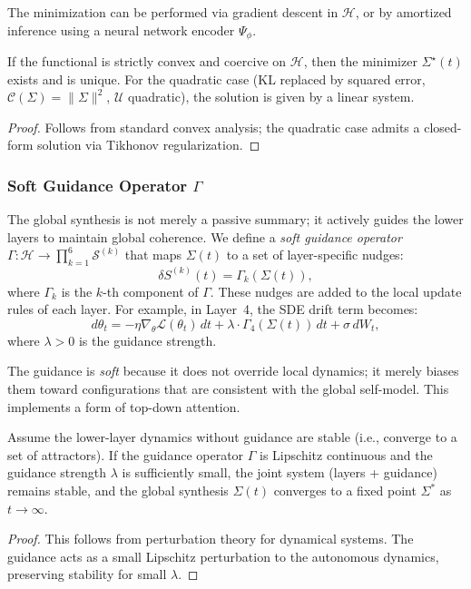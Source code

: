 The minimization can be performed via gradient descent in $\mathcal{H}$, or by amortized inference using a neural network encoder $\Psi_\phi$.

\begin{proposition}
\label{prop:synthesis_existence}
If the functional is strictly convex and coercive on $\mathcal{H}$, then the minimizer $\Sigma^\star(t)$ exists and is unique. For the quadratic case (KL replaced by squared error, $\mathcal{C}(\Sigma)=\|\Sigma\|^2$, $\mathcal{U}$ quadratic), the solution is given by a linear system.
\end{proposition}
\begin{proof}
Follows from standard convex analysis; the quadratic case admits a closed-form solution via Tikhonov regularization.
\end{proof}

\subsubsection{Soft Guidance Operator $\Gamma$}
The global synthesis is not merely a passive summary; it actively guides the lower layers to maintain global coherence. We define a \emph{soft guidance operator} $\Gamma: \mathcal{H} \to \prod_{k=1}^6 \mathcal{S}^{(k)}$ that maps $\Sigma(t)$ to a set of layer-specific nudges:
\[
\delta S^{(k)}(t) = \Gamma_k(\Sigma(t)),
\]
where $\Gamma_k$ is the $k$-th component of $\Gamma$. These nudges are added to the local update rules of each layer. For example, in Layer~4, the SDE drift term becomes:
\[
d\theta_t = -\eta \nabla_\theta \mathcal{L}(\theta_t) \, dt + \lambda \cdot \Gamma_4(\Sigma(t)) \, dt + \sigma \, dW_t,
\]
where $\lambda > 0$ is the guidance strength.

The guidance is \emph{soft} because it does not override local dynamics; it merely biases them toward configurations that are consistent with the global self-model. This implements a form of top-down attention.

\begin{theorem}
\label{thm:guidance_stability}
Assume the lower-layer dynamics without guidance are stable (i.e., converge to a set of attractors). If the guidance operator $\Gamma$ is Lipschitz continuous and the guidance strength $\lambda$ is sufficiently small, the joint system (layers + guidance) remains stable, and the global synthesis $\Sigma(t)$ converges to a fixed point $\Sigma^*$ as $t \to \infty$.
\end{theorem}
\begin{proof}
This follows from perturbation theory for dynamical systems. The guidance acts as a small Lipschitz perturbation to the autonomous dynamics, preserving stability for small $\lambda$.
\end{proof}

